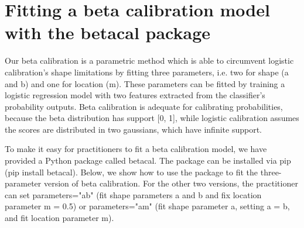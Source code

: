 \documentclass[oneside]{article}\usepackage[]{graphicx}\usepackage[]{color}
\begin{document}
\section*{Fitting a beta calibration model with the betacal package}

Our beta calibration is a parametric method which is able to circumvent logistic calibration's shape limitations by fitting three parameters, i.e. two for shape (a and b) and one for location (m). These parameters can be fitted by training a logistic regression model with two features extracted from the classifier's probability outputs. Beta calibration is adequate for calibrating probabilities, because the beta distribution has support [0, 1], while logistic calibration assumes the scores are distributed in two gaussians, which have infinite support.

To make it easy for practitioners to fit a beta calibration model, we have provided a Python package called betacal. The package can be installed via pip (pip install betacal). Below, we show how to use the package to fit the three-parameter version of beta calibration. For the other two versions, the practitioner can set parameters="ab" (fit shape parameters a and b and fix location parameter m = 0.5) or parameters="am" (fit shape parameter a, setting a = b, and fit location parameter m).
\end{document}
